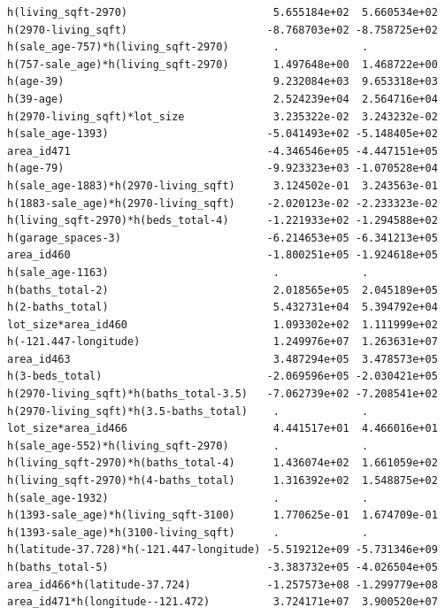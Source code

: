 \documentclass[
]{article}
\begin{document}
\begin{verbatim}
h(living_sqft-2970)                       5.655184e+02  5.660534e+02
h(2970-living_sqft)                      -8.768703e+02 -8.758725e+02
h(sale_age-757)*h(living_sqft-2970)       .             .           
h(757-sale_age)*h(living_sqft-2970)       1.497648e+00  1.468722e+00
h(age-39)                                 9.232084e+03  9.653318e+03
h(39-age)                                 2.524239e+04  2.564716e+04
h(2970-living_sqft)*lot_size              3.235322e-02  3.243232e-02
h(sale_age-1393)                         -5.041493e+02 -5.148405e+02
area_id471                               -4.346546e+05 -4.447151e+05
h(age-79)                                -9.923323e+03 -1.070528e+04
h(sale_age-1883)*h(2970-living_sqft)      3.124502e-01  3.243563e-01
h(1883-sale_age)*h(2970-living_sqft)     -2.020123e-02 -2.233323e-02
h(living_sqft-2970)*h(beds_total-4)      -1.221933e+02 -1.294588e+02
h(garage_spaces-3)                       -6.214653e+05 -6.341213e+05
area_id460                               -1.800251e+05 -1.924618e+05
h(sale_age-1163)                          .             .           
h(baths_total-2)                          2.018565e+05  2.045189e+05
h(2-baths_total)                          5.432731e+04  5.394792e+04
lot_size*area_id460                       1.093302e+02  1.111999e+02
h(-121.447-longitude)                     1.249976e+07  1.263631e+07
area_id463                                3.487294e+05  3.478573e+05
h(3-beds_total)                          -2.069596e+05 -2.030421e+05
h(2970-living_sqft)*h(baths_total-3.5)   -7.062739e+02 -7.208541e+02
h(2970-living_sqft)*h(3.5-baths_total)    .             .           
lot_size*area_id466                       4.441517e+01  4.466016e+01
h(sale_age-552)*h(living_sqft-2970)       .             .           
h(living_sqft-2970)*h(baths_total-4)      1.436074e+02  1.661059e+02
h(living_sqft-2970)*h(4-baths_total)      1.316392e+02  1.548875e+02
h(sale_age-1932)                          .             .           
h(1393-sale_age)*h(living_sqft-3100)      1.770625e-01  1.674709e-01
h(1393-sale_age)*h(3100-living_sqft)      .             .           
h(latitude-37.728)*h(-121.447-longitude) -5.519212e+09 -5.731346e+09
h(baths_total-5)                         -3.383732e+05 -4.026504e+05
area_id466*h(latitude-37.724)            -1.257573e+08 -1.299779e+08
area_id471*h(longitude--121.472)          3.724171e+07  3.900520e+07
                                                                    

\end{verbatim}
\end{document}
